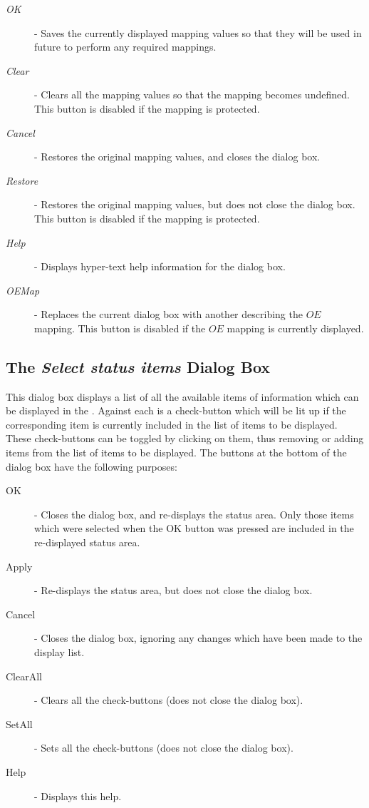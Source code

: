 \begin{description}
\item [{\em OK}] - Saves the currently displayed mapping values so that
they will be used in future to perform any required mappings. 
\item [{\em Clear}] - Clears all the mapping values so that the mapping
becomes undefined. This button is disabled if the mapping is protected.
\item [{\em Cancel}] - Restores the original mapping values, and closes
the dialog box.
\item [{\em Restore}] - Restores the original mapping values, but does not
close the dialog box. This button is disabled if the mapping is protected.
\item [{\em Help}] - Displays hyper-text help information for the dialog
box.
\item [{\em OEMap}] - Replaces the current dialog box with another
describing the $OE$ mapping. This button is disabled if the $OE$ mapping
is currently displayed.
\end{description}

\subsection {The {\em Select status items} Dialog Box}
This dialog box displays a list of all the available items of information
which can be displayed in the .
Against each is a check-button which will be lit up if the corresponding
item is currently included in the list of items to be displayed. These
check-buttons can be toggled by clicking on them, thus removing or adding
items from the list of items to be displayed. The buttons at the bottom
of the dialog box have the following purposes:

\begin{description}
\item [OK] - Closes the dialog box, and re-displays the status area.
Only those items which were selected when the OK button was pressed are
included in the re-displayed status area.
\item [Apply] - Re-displays the status area, but does not close the
dialog box.
\item [Cancel] - Closes the dialog box, ignoring any changes which have
been made to the display list.
\item [ClearAll] - Clears all the check-buttons (does not close the dialog box).
\item [SetAll] - Sets all the check-buttons (does not close the dialog box).
\item [Help] - Displays this help.
\end{description}


